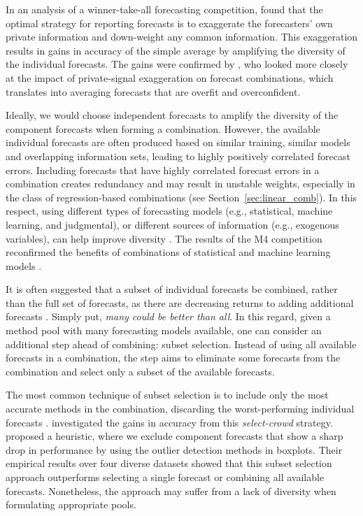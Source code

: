 \documentclass[a4paper,11pt]{article}
\begin{document}
In an analysis of a winner-take-all forecasting competition, \citet{Lichtendahl2013-ws} found that the optimal strategy for reporting forecasts is to exaggerate the forecasters' own private information and down-weight any common information. This exaggeration results in gains in accuracy of the simple average by amplifying the diversity of the individual forecasts. The gains were confirmed by \citet{Grushka-Cockayne2017-dj}, who looked more closely at the impact of private-signal exaggeration on forecast combinations, which translates into averaging forecasts that are overfit and overconfident.

Ideally, we would choose independent forecasts to amplify the diversity of the component forecasts when forming a combination. However, the available individual forecasts are often produced based on similar training, similar models and overlapping information sets, leading to highly positively correlated forecast errors. Including forecasts that have highly correlated forecast errors in a combination creates redundancy and may result in unstable weights, especially in the class of regression-based combinations (see Section~\ref{sec:linear_comb}). In this respect, using different types of forecasting models (e.g., statistical, machine learning, and judgmental), or different sources of information (e.g., exogenous variables), can help improve diversity \citep{Atiya2020-ge}. The results of the M4 competition reconfirmed the benefits of combinations of statistical and machine learning models \citep{Makridakis2020-hu}.

It is often suggested that a subset of individual forecasts be combined, rather than the full set of forecasts, as there are decreasing returns to adding additional forecasts \citep{Armstrong2001-sj,Zhou2002-cg,Hibon2005-ok,Geweke2011-xk,Diebold2019-ml,Lichtendahl2020-ut}. Simply put, \textit{many could be better than all}. In this regard, given a method pool with many forecasting models available, one can consider an additional step ahead of combining: subset selection. Instead of using all available forecasts in a combination, the step aims to eliminate some forecasts from the combination and select only a subset of the available forecasts.

The most common technique of subset selection is to include only the most accurate methods in the combination, discarding the worst-performing individual forecasts \citep[e.g.,][]{Granger2004-sw}. \citet{Mannes2014-dl} investigated the gains in accuracy from this \textit{select-crowd} strategy. \citet{Kourentzes2019-na} proposed a heuristic, where we exclude component forecasts that show a sharp drop in performance by using the outlier detection methods in boxplots. Their empirical results over four diverse datasets showed that this subset selection approach outperforms selecting a single forecast or combining all available forecasts. Nonetheless, the approach may suffer from a lack of diversity when formulating appropriate pools.
\end{document}

